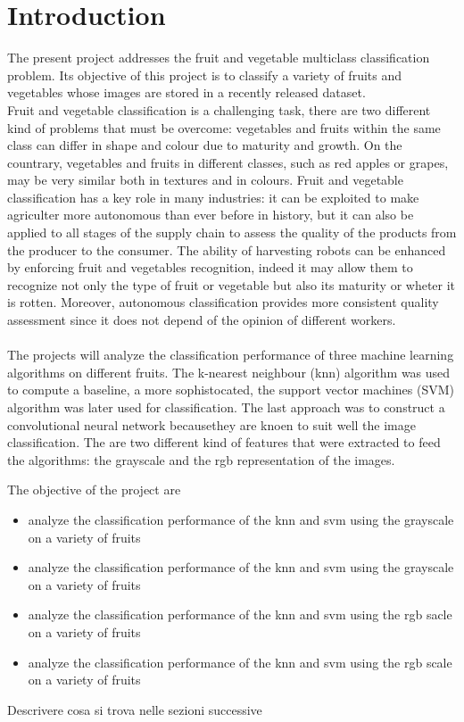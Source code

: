 \documentclass{article}
\begin{document}
\section{Introduction}


The present project addresses the fruit and vegetable multiclass classification problem. Its objective of this project is to classify a variety of fruits and vegetables whose images are stored in a recently released dataset.\\
Fruit and vegetable classification is a challenging task, there are two different kind of problems that must be overcome: vegetables and fruits within the same class can differ in shape and colour due to maturity and growth. On the countrary, vegetables and fruits in different classes, such as red apples or grapes, may be very similar both in textures and in colours. 
Fruit and vegetable classification has a key role in many industries: it can be exploited to make agriculter more autonomous than ever before in history, but it can also be applied to all stages of the supply chain to assess the quality of the products from the producer to the consumer. 
The ability of harvesting robots can be enhanced by enforcing fruit and vegetables recognition, indeed it may allow them to recognize not only the type of fruit or vegetable but also its maturity or wheter it is rotten. Moreover, autonomous classification provides more consistent quality assessment since it does not depend of the opinion of different workers.
\\\\
The projects will analyze the classification performance of three machine learning algorithms on different fruits. The k-nearest neighbour (knn) algorithm was used to compute a baseline, a more sophistocated, the support vector machines (SVM) algorithm was later used for classification. The last approach was to construct a convolutional neural network becausethey are knoen to suit well the image classification. The are two different kind of features that were extracted to feed the algorithms: the grayscale and the rgb representation of the images.

The objective of the project are
\begin{itemize}
\item analyze the classification performance of the knn and svm using the grayscale on a variety of fruits
\item analyze the classification performance of the knn and svm using the grayscale on a variety of fruits
\item analyze the classification performance of the knn and svm using the rgb sacle on a variety of fruits
\item analyze the classification performance of the knn and svm using the rgb scale on a variety of fruits
\end{itemize}
Descrivere cosa si trova nelle sezioni successive
\end{document}
